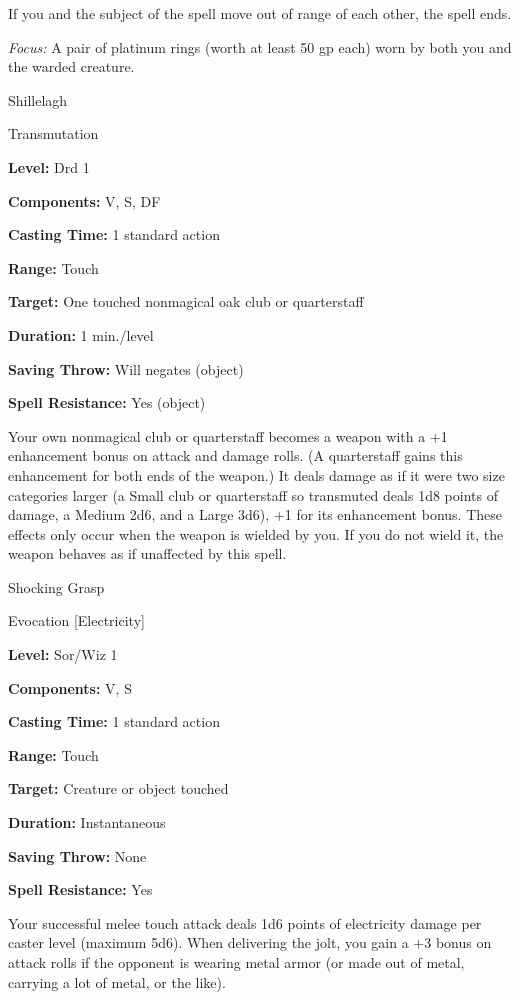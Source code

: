 \documentclass{article}
\begin{document}
If you and the subject of the spell move out of range of each other, the spell 
ends.

\textit{Focus: }A pair of platinum rings (worth at least 50 gp each) worn by both 
you and the warded creature.

\vspace{12pt}
Shillelagh

Transmutation

\textbf{Level:} Drd 1

\textbf{Components:} V, S, DF

\textbf{Casting Time:} 1 standard action

\textbf{Range:} Touch

\textbf{Target:} One touched nonmagical oak club or quarterstaff

\textbf{Duration:} 1 min./level

\textbf{Saving Throw: }Will negates (object)

\textbf{Spell Resistance:} Yes (object)

Your own nonmagical club or quarterstaff becomes a weapon with a +1 enhancement 
bonus on attack and damage rolls. (A quarterstaff gains this enhancement for both 
ends of the weapon.) It deals damage as if it were two size categories larger (a 
Small club or quarterstaff so transmuted deals 1d8 points of damage, a Medium 2d6, 
and a Large 3d6), +1 for its enhancement bonus. These effects only occur when the 
weapon is wielded by you. If you do not wield it, the weapon behaves as if unaffected 
by this spell.

\vspace{12pt}
Shocking Grasp

Evocation [Electricity]

\textbf{Level:} Sor/Wiz 1

\textbf{Components:} V, S

\textbf{Casting Time:} 1 standard action

\textbf{Range:} Touch

\textbf{Target:} Creature or object touched

\textbf{Duration:} Instantaneous

\textbf{Saving Throw:} None

\textbf{Spell Resistance:} Yes

Your successful melee touch attack deals 1d6 points of electricity damage per caster 
level (maximum 5d6). When delivering the jolt, you gain a +3 bonus on attack rolls 
if the opponent is wearing metal armor (or made out of metal, carrying a lot of 
metal, or the like).
\end{document}
